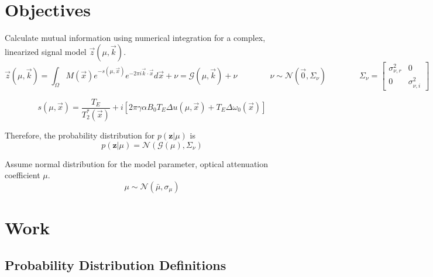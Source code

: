 \documentclass{article}         %
\theoremstyle{definition}
\theoremstyle{remark}
\newcommand{\eq}[1]{\begin{equation} #1 \end{equation}}
\newcommand{\zcond}{\mathbf{z}|\mu}
\newcommand{\Gscript}{\mathcal{G}}
\newcommand{\Nscript}{\mathcal{N}}
\newcommand{\paren}[1]{\left(#1\right)}
\begin{document}

\section{Objectives}\label{Objectives}

Calculate mutual information using numerical integration for a complex, linearized signal model $\vec{z}\left(\mu,\vec{k}\right)$.  
\begin{equation}
	\vec{z}\left(\mu,\vec{k}\right) = \int_\Omega M\left(\vec{x}\right) e^{-s\left(\mu ,\vec{x}\right)}e^{-2\pi i\vec{k}\cdot\vec{x}}d\vec{x}+\nu=\mathcal{G}\left(\mu,\vec{k}\right)+\nu
	\qquad\qquad \nu\sim\mathcal{N}\left(\vec{0},\Sigma_\nu\right)
	\qquad\qquad \Sigma_\nu = \left[ \begin{array}{cc} 
		\sigma_{\nu,r}^2 & 0 \\
		0 & \sigma_{\nu,i}^2 \end{array} \right]
\end{equation}

\[
	s\left(\mu,\vec{x}\right)=\frac{T_E}{T_2^*\left(\vec{x}\right)}+i\left[2\pi\gamma\alpha B_0 T_E
	\Delta u\left(\mu,\vec{x}\right)+T_E\Delta\omega_0\left(\vec{x}\right)\right]
\]

Therefore, the probability distribution for $p\paren{\zcond}$ is
\eq{p\paren{\zcond} = \Nscript\paren{\Gscript\paren{\mu},\Sigma_\nu}}

Assume normal distribution for the model parameter, optical attenuation coefficient $\mu$.
\begin{equation}
	\mu\sim\mathcal{N}\left(\bar{\mu},\sigma_\mu\right)
\end{equation}

\section{Work}\label{Work}

\subsection{Probability Distribution Definitions}\label{Probability Distribution Definitions}
\end{document}
